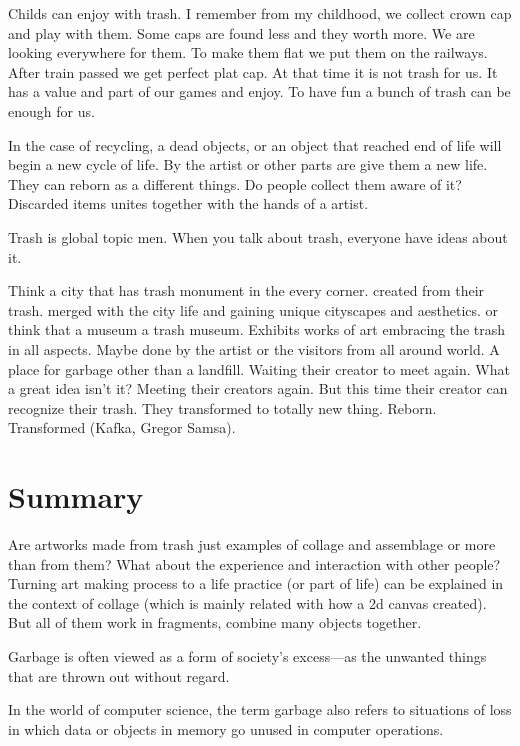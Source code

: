 Childs can enjoy with trash. I remember from my childhood, we collect crown cap and play with them. Some caps are found less and they worth more. We are looking everywhere for them. To make them flat we put them on the railways. After train passed we get perfect plat cap. At that time it is not trash for us. It has a value and part of our games and enjoy. To have fun a bunch of trash can be enough for us.

In the case of recycling, a dead objects, or an object that reached end of life will begin a new cycle of life. By the artist or other parts are give them a new life. They can reborn as a different things. Do people collect them aware of it? Discarded items unites together with the hands of a artist. 

Trash is global topic men. When you talk about trash, everyone have ideas about it. 

Think a city that has trash monument in the every corner. created from their trash. merged with the city life and gaining unique cityscapes and aesthetics. or think that a museum a trash museum. Exhibits works of art embracing the trash in all aspects. Maybe done by the artist or the visitors from all around world. A place for garbage other than a landfill. Waiting their creator to meet again. What a great idea isn't it? Meeting their creators again. But this time their creator can recognize their trash. They transformed to totally new thing. Reborn. Transformed (Kafka, Gregor Samsa).




\section{Summary}
Are artworks made from trash just examples of collage and assemblage or more than from them? What about the experience and interaction with other people? Turning art making process to a life practice (or part of life) can be explained in the context of collage (which is mainly related with how a 2d canvas created). But all of them work in fragments, combine many objects together. 

Garbage is often viewed as a form of society’s excess---as the unwanted things that are thrown out without regard. 

In the world of computer science, the term garbage also refers to situations of loss in which data or objects in memory go unused in computer operations.

